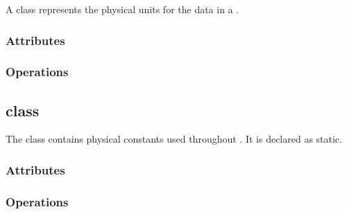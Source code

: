 \documentclass{article}
\begin{document}
A  class represents the physical units for the data in a
.

\subsubsection{Attributes}

\subsubsection{Operations}

\subsection{ class}

The  class contains physical constants used throughout
\cello.  It is declared as static.

\subsubsection{Attributes}

\subsubsection{Operations}

\end{document}
